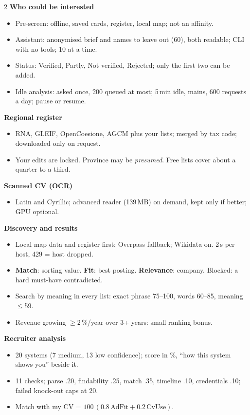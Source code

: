 \begin{multicols}{2}
\textbf{\color{othRed}Who could be interested}
\begin{itemize}
  \item Pre-screen: offline, saved cards, register, local map; not an affinity.
  \item Assistant: anonymised brief and names to leave out (60), both readable; CLI with no tools; 10 at a time.
  \item Status: Verified, Partly, Not verified, Rejected; only the first two can be added.
  \item Idle analysis: asked once, 200 queued at most; 5\,min idle, mains, 600 requests a day; pause or resume.
\end{itemize}

\textbf{\color{othRed}Regional register}
\begin{itemize}
  \item RNA, GLEIF, OpenCoesione, AGCM plus your lists; merged by tax code; downloaded only on request.
  \item Your edits are locked. Province may be \emph{presumed}. Free lists cover about a quarter to a third.
\end{itemize}

\textbf{\color{othRed}Scanned CV (OCR)}
\begin{itemize}
  \item Latin and Cyrillic; advanced reader (139\,MB) on demand, kept only if better; GPU optional.
\end{itemize}

\columnbreak

\textbf{\color{othRed}Discovery and results}
\begin{itemize}
  \item Local map data and register first; Overpass fallback; Wikidata on. 2\,s per host, 429 = host dropped.
  \item \textbf{Match}: sorting value. \textbf{Fit}: best posting. \textbf{Relevance}: company. Blocked: a hard must-have contradicted.
  \item Search by meaning in every list: exact phrase 75--100, words 60--85, meaning $\leq$59.
  \item Revenue growing $\geq$2\,\%/year over 3+ years: small ranking bonus.
\end{itemize}

\textbf{\color{othRed}Recruiter analysis}
\begin{itemize}
  \item 20 systems (7 medium, 13 low confidence); score in \%, ``how this system shows you'' beside it.
  \item 11 checks; parse .20, findability .25, match .35, timeline .10, credentials .10; failed knock-out caps at 20.
  \item Match with my CV = $100\,(0.8\,\mathrm{AdFit}+0.2\,\mathrm{CvUse})$.
\end{itemize}


\end{multicols}
